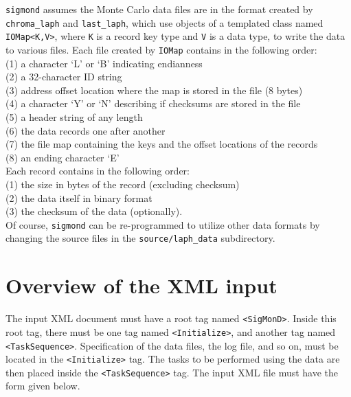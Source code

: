 \documentclass[12pt,notitlepage,letterpaper]{article}
\newcommand{\vb}{\texttt}
\begin{document}
\vb{sigmond} assumes the Monte Carlo data files are in the format
created by \vb{chroma\_laph} and \vb{last\_laph}, which use objects
of a templated class named \vb{IOMap<K,V>}, where \vb{K} is a record 
key type and \vb{V} is a data type, to write the data to various
files.  Each file created by \vb{IOMap} contains in the following order:\\
\hspace*{20pt}(1) a character `L' or `B' indicating endianness\\
\hspace*{20pt}(2) a 32-character ID string\\
\hspace*{20pt}(3) address offset location where the map is stored in the file (8 bytes) \\
\hspace*{20pt}(4) a character `Y' or `N' describing if checksums are stored in the file \\
\hspace*{20pt}(5) a header string of any length\\
\hspace*{20pt}(6) the data records one after another \\
\hspace*{20pt}(7) the file map containing the keys and the offset locations of the records\\
\hspace*{20pt}(8) an ending character `E'\\
Each record contains in the following order:\\
\hspace*{20pt}(1) the size in bytes of the record (excluding checksum)\\
\hspace*{20pt}(2) the data itself in binary format\\
\hspace*{20pt}(3) the checksum of the data (optionally).\\
Of course, \vb{sigmond} can be re-programmed to utilize other data formats
by changing the source files in the \vb{source/laph\_data} subdirectory.


\section{Overview of the XML input}
The input XML document must have a root tag named \vb{<SigMonD>}. 
Inside this root tag, there must be one tag named \vb{<Initialize>},
and another tag named \vb{<TaskSequence>}.  Specification of the data
files, the log file, and so on, must be located in the \vb{<Initialize>}
tag.  The tasks to be performed using the data are then placed inside
the \vb{<TaskSequence>} tag.   The input XML file must have the form
given below.    
\end{document}
